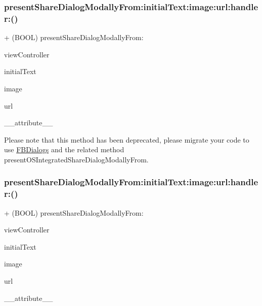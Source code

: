 \subsubsection{\texorpdfstring{present\+Share\+Dialog\+Modally\+From\+:initial\+Text\+:image\+:url\+:handler\+:()}{presentShareDialogModallyFrom:initialText:image:url:handler:()}\hspace{0.1cm}{\footnotesize\ttfamily [3/5]}}
{\footnotesize\ttfamily + (B\+O\+OL) present\+Share\+Dialog\+Modally\+From\+: \begin{DoxyParamCaption}\item[{(U\+I\+View\+Controller $\ast$)}]{view\+Controller }\item[{initialText:(N\+S\+String $\ast$)}]{initial\+Text }\item[{image:(U\+I\+Image $\ast$)}]{image }\item[{url:(N\+S\+U\+RL $\ast$)}]{url }\item[{handler:((deprecated))}]{\+\_\+\+\_\+attribute\+\_\+\+\_\+ }\end{DoxyParamCaption}}

Please note that this method has been deprecated, please migrate your code to use {\ttfamily \hyperlink{interfaceFBDialogs}{F\+B\+Dialogs}} and the related method {\ttfamily present\+O\+S\+Integrated\+Share\+Dialog\+Modally\+From}. \mbox{\label{interfaceFBNativeDialogs_a536cf508be27488381344840016d83a1}} 
\subsubsection{\texorpdfstring{present\+Share\+Dialog\+Modally\+From\+:initial\+Text\+:image\+:url\+:handler\+:()}{presentShareDialogModallyFrom:initialText:image:url:handler:()}\hspace{0.1cm}{\footnotesize\ttfamily [4/5]}}
{\footnotesize\ttfamily + (B\+O\+OL) present\+Share\+Dialog\+Modally\+From\+: \begin{DoxyParamCaption}\item[{(U\+I\+View\+Controller $\ast$)}]{view\+Controller }\item[{initialText:(N\+S\+String $\ast$)}]{initial\+Text }\item[{image:(U\+I\+Image $\ast$)}]{image }\item[{url:(N\+S\+U\+RL $\ast$)}]{url }\item[{handler:((deprecated))}]{\+\_\+\+\_\+attribute\+\_\+\+\_\+ }\end{DoxyParamCaption}}

